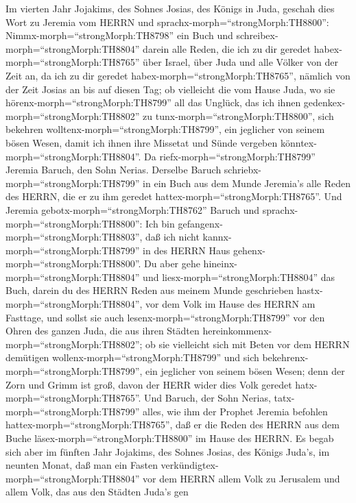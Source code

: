  Im vierten Jahr Jojakims, des Sohnes Josias, des Königs in
Juda, geschah dies Wort zu Jeremia vom HERRN und
sprachx-morph=``strongMorph:TH8800'': 
Nimmx-morph=``strongMorph:TH8798'' ein Buch und
schreibex-morph=``strongMorph:TH8804'' darein alle Reden, die ich zu dir
geredet habex-morph=``strongMorph:TH8765'' über Israel, über Juda und
alle Völker von der Zeit an, da ich zu dir geredet
habex-morph=``strongMorph:TH8765'', nämlich von der Zeit Josias an bis
auf diesen Tag;  ob vielleicht die vom Hause Juda, wo sie
hörenx-morph=``strongMorph:TH8799'' all das Unglück, das ich ihnen
gedenkex-morph=``strongMorph:TH8802'' zu
tunx-morph=``strongMorph:TH8800'', sich bekehren
wolltenx-morph=``strongMorph:TH8799'', ein jeglicher von seinem bösen
Wesen, damit ich ihnen ihre Missetat und Sünde vergeben
könntex-morph=``strongMorph:TH8804''.  Da
riefx-morph=``strongMorph:TH8799'' Jeremia Baruch, den Sohn Nerias.
Derselbe Baruch schriebx-morph=``strongMorph:TH8799'' in ein Buch aus
dem Munde Jeremia's alle Reden des HERRN, die er zu ihm geredet
hattex-morph=``strongMorph:TH8765''.  Und Jeremia
gebotx-morph=``strongMorph:TH8762'' Baruch und
sprachx-morph=``strongMorph:TH8800'': Ich bin
gefangenx-morph=``strongMorph:TH8803'', daß ich nicht
kannx-morph=``strongMorph:TH8799'' in des HERRN Haus
gehenx-morph=``strongMorph:TH8800''.  Du aber gehe
hineinx-morph=``strongMorph:TH8804'' und
liesx-morph=``strongMorph:TH8804'' das Buch, darein du des HERRN Reden
aus meinem Munde geschrieben hastx-morph=``strongMorph:TH8804'', vor dem
Volk im Hause des HERRN am Fasttage, und sollst sie auch
lesenx-morph=``strongMorph:TH8799'' vor den Ohren des ganzen Juda, die
aus ihren Städten hereinkommenx-morph=``strongMorph:TH8802'';
 ob sie vielleicht sich mit Beten vor dem HERRN demütigen
wollenx-morph=``strongMorph:TH8799'' und sich
bekehrenx-morph=``strongMorph:TH8799'', ein jeglicher von seinem bösen
Wesen; denn der Zorn und Grimm ist groß, davon der HERR wider dies Volk
geredet hatx-morph=``strongMorph:TH8765''.  Und Baruch, der
Sohn Nerias, tatx-morph=``strongMorph:TH8799'' alles, wie ihm der
Prophet Jeremia befohlen hattex-morph=``strongMorph:TH8765'', daß er die
Reden des HERRN aus dem Buche läsex-morph=``strongMorph:TH8800'' im
Hause des HERRN.  Es begab sich aber im fünften Jahr
Jojakims, des Sohnes Josias, des Königs Juda's, im neunten Monat, daß
man ein Fasten verkündigtex-morph=``strongMorph:TH8804'' vor dem HERRN
allem Volk zu Jerusalem und allem Volk, das aus den Städten Juda's gen
